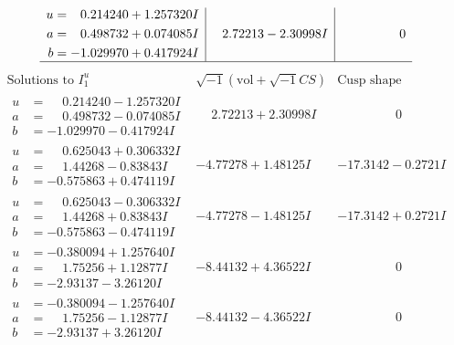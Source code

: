 \documentclass[1p]{elsarticle_modified}
\theoremstyle{definition}
\newcommand{\I}{\sqrt{-1}}
\begin{document}
$$\begin{array}{c|c|c}
\begin{aligned}
u &= \phantom{-}0.214240 + 1.257320 I \\
a &= \phantom{-}0.498732 + 0.074085 I \\
b &= -1.029970 + 0.417924 I\end{aligned}
 & \phantom{-}2.72213 - 2.30998 I & \phantom{-0.000000 } 0\\
 \hline 
 \end{array}$$\newpage$$\begin{array}{c|c|c}  
\text{Solutions to }I^u_{1}& \I (\text{vol} + \sqrt{-1}CS) & \text{Cusp shape}\\
 \hline 
\begin{aligned}
u &= \phantom{-}0.214240 - 1.257320 I \\
a &= \phantom{-}0.498732 - 0.074085 I \\
b &= -1.029970 - 0.417924 I\end{aligned}
 & \phantom{-}2.72213 + 2.30998 I & \phantom{-0.000000 } 0 \\ \hline\begin{aligned}
u &= \phantom{-}0.625043 + 0.306332 I \\
a &= \phantom{-}1.44268 - 0.83843 I \\
b &= -0.575863 + 0.474119 I\end{aligned}
 & -4.77278 + 1.48125 I & -17.3142 - 0.2721 I \\ \hline\begin{aligned}
u &= \phantom{-}0.625043 - 0.306332 I \\
a &= \phantom{-}1.44268 + 0.83843 I \\
b &= -0.575863 - 0.474119 I\end{aligned}
 & -4.77278 - 1.48125 I & -17.3142 + 0.2721 I \\ \hline\begin{aligned}
u &= -0.380094 + 1.257640 I \\
a &= \phantom{-}1.75256 + 1.12877 I \\
b &= -2.93137 - 3.26120 I\end{aligned}
 & -8.44132 + 4.36522 I & \phantom{-0.000000 } 0 \\ \hline\begin{aligned}
u &= -0.380094 - 1.257640 I \\
a &= \phantom{-}1.75256 - 1.12877 I \\
b &= -2.93137 + 3.26120 I\end{aligned}
 & -8.44132 - 4.36522 I & \phantom{-0.000000 } 0 \\ \hline\begin{aligned}

\end{aligned}
\end{array}$$
\end{document}
